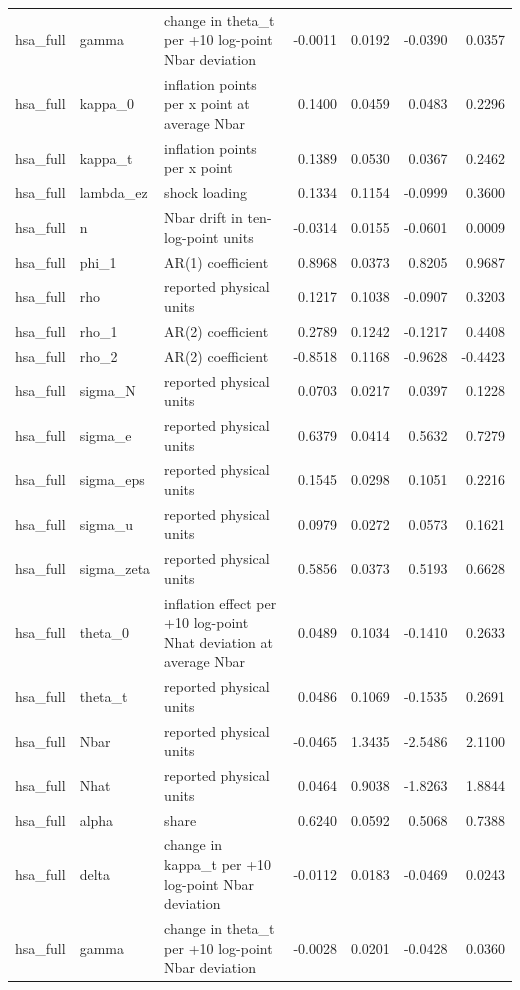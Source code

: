 \begin{tabular}{lllrrrr}
hsa\_full & gamma & change in theta\_t per +10 log-point Nbar deviation & -0.0011 & 0.0192 & -0.0390 & 0.0357 \\
hsa\_full & kappa\_0 & inflation points per x point at average Nbar & 0.1400 & 0.0459 & 0.0483 & 0.2296 \\
hsa\_full & kappa\_t & inflation points per x point & 0.1389 & 0.0530 & 0.0367 & 0.2462 \\
hsa\_full & lambda\_ez & shock loading & 0.1334 & 0.1154 & -0.0999 & 0.3600 \\
hsa\_full & n & Nbar drift in ten-log-point units & -0.0314 & 0.0155 & -0.0601 & 0.0009 \\
hsa\_full & phi\_1 & AR(1) coefficient & 0.8968 & 0.0373 & 0.8205 & 0.9687 \\
hsa\_full & rho & reported physical units & 0.1217 & 0.1038 & -0.0907 & 0.3203 \\
hsa\_full & rho\_1 & AR(2) coefficient & 0.2789 & 0.1242 & -0.1217 & 0.4408 \\
hsa\_full & rho\_2 & AR(2) coefficient & -0.8518 & 0.1168 & -0.9628 & -0.4423 \\
hsa\_full & sigma\_N & reported physical units & 0.0703 & 0.0217 & 0.0397 & 0.1228 \\
hsa\_full & sigma\_e & reported physical units & 0.6379 & 0.0414 & 0.5632 & 0.7279 \\
hsa\_full & sigma\_eps & reported physical units & 0.1545 & 0.0298 & 0.1051 & 0.2216 \\
hsa\_full & sigma\_u & reported physical units & 0.0979 & 0.0272 & 0.0573 & 0.1621 \\
hsa\_full & sigma\_zeta & reported physical units & 0.5856 & 0.0373 & 0.5193 & 0.6628 \\
hsa\_full & theta\_0 & inflation effect per +10 log-point Nhat deviation at average Nbar & 0.0489 & 0.1034 & -0.1410 & 0.2633 \\
hsa\_full & theta\_t & reported physical units & 0.0486 & 0.1069 & -0.1535 & 0.2691 \\
hsa\_full & Nbar & reported physical units & -0.0465 & 1.3435 & -2.5486 & 2.1100 \\
hsa\_full & Nhat & reported physical units & 0.0464 & 0.9038 & -1.8263 & 1.8844 \\
hsa\_full & alpha & share & 0.6240 & 0.0592 & 0.5068 & 0.7388 \\
hsa\_full & delta & change in kappa\_t per +10 log-point Nbar deviation & -0.0112 & 0.0183 & -0.0469 & 0.0243 \\
hsa\_full & gamma & change in theta\_t per +10 log-point Nbar deviation & -0.0028 & 0.0201 & -0.0428 & 0.0360 \\

\end{tabular}

